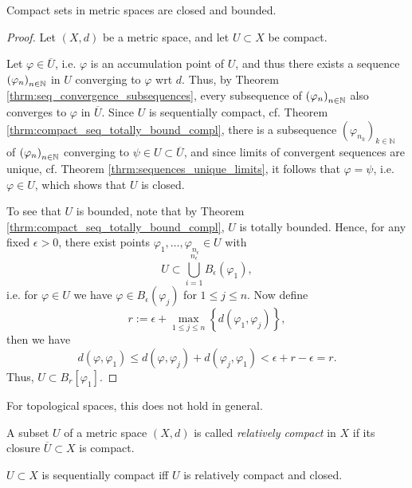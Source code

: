 \begin{corollary}
	Compact sets in metric spaces are closed and bounded.
\end{corollary}

\begin{proof}
	Let $(X, d)$ be a metric space, and let $U\subset X$ be compact. 
	
	Let $\varphi\in \overline{U}$, i.e. $\varphi$ is an accumulation point of $U$, and thus there exists a sequence $\seq[\varphi_n]$ in $U$ converging to $\varphi$ wrt $d$. Thus, by Theorem \ref{thrm:seq_convergence_subsequences}, every subsequence of $\seq[\varphi_n]$ also converges to $\varphi$ in $\overline{U}$. Since $U$ is sequentially compact, cf. Theorem \ref{thrm:compact_seq_totally_bound_compl}, there is a subsequence $\left(\varphi_{n_k}\right)_{k\in\mathbb N}$ of $\seq[\varphi_n]$ converging to $\psi\in U\subset \overline{U}$, and since limits of convergent sequences are unique, cf. Theorem \ref{thrm:sequences_unique_limits}, it follows that $\varphi=\psi$, i.e. $\varphi\in U$, which shows that $U$ is closed.
	
	To see that $U$ is bounded, note that by Theorem \ref{thrm:compact_seq_totally_bound_compl}, $U$ is totally bounded. Hence, for any fixed $\epsilon > 0$, there exist points $\varphi_1, \dots, \varphi_{n_{\epsilon}}\in U$ with $$U\subset \bigcup_{i = 1}^{n_{\epsilon}}B_{\epsilon}(\varphi_1),$$ i.e. for $\varphi\in U$ we have $\varphi\in B_{\epsilon}(\varphi_j)$ for $1\leq j\leq n$. Now define
	$$r := \epsilon + \max_{1\leq j\leq n}\left\{ d(\varphi_1, \varphi_j)\right\},$$
	then we have
	$$d(\varphi, \varphi_1) \leq d(\varphi, \varphi_j) + d(\varphi_j, \varphi_1) < \epsilon + r - \epsilon = r.$$
	Thus, $U\subset B_{r}[\varphi_1]$.
\end{proof}

\begin{remark}
	For topological spaces, this does not hold in general.
\end{remark}

\begin{defn}
	A subset $U$ of a metric space $(X, d)$ is called \textit{relatively compact} in $X$ if its closure $\overline{U}\subset X$ is compact.
\end{defn}

\begin{theorem}
	$U\subset X$ is sequentially compact iff $U$ is relatively compact and closed.
\end{theorem}

